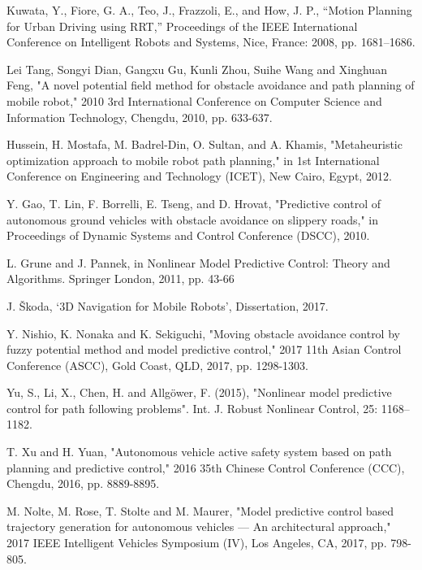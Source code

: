 \documentclass[conference,11pt]{IEEEtran}
\begin{document}
\balance

\begin{thebibliography}{00}
	
	Kuwata, Y., Fiore, G. A., Teo, J., Frazzoli, E., and How, J. P., “Motion Planning for Urban Driving using RRT,” Proceedings of the IEEE International Conference on Intelligent Robots and Systems, Nice, France: 2008, pp. 1681–1686.
	
	Lei Tang, Songyi Dian, Gangxu Gu, Kunli Zhou, Suihe Wang and Xinghuan Feng, "A novel potential field method for obstacle avoidance and path planning of mobile robot," 2010 3rd International Conference on Computer Science and Information Technology, Chengdu, 2010, pp. 633-637.
	
	Hussein, H. Mostafa, M. Badrel-Din, O. Sultan, and A. Khamis, "Metaheuristic optimization approach to mobile robot path planning," in 1st International Conference on Engineering and Technology (ICET), New Cairo, Egypt, 2012.
	
	Y. Gao, T. Lin, F. Borrelli, E. Tseng, and D. Hrovat, "Predictive control of autonomous ground vehicles with obstacle avoidance on slippery roads," in Proceedings of Dynamic Systems and Control Conference (DSCC), 2010.
	
	L. Grune and J. Pannek, in Nonlinear Model Predictive Control: Theory and Algorithms. Springer London, 2011, pp. 43-66
	
	J. Škoda, ‘3D Navigation for Mobile Robots’, Dissertation, 2017.
	
	Y. Nishio, K. Nonaka and K. Sekiguchi, "Moving obstacle avoidance control by fuzzy potential method and model predictive control," 2017 11th Asian Control Conference (ASCC), Gold Coast, QLD, 2017, pp. 1298-1303.
	
	Yu, S., Li, X., Chen, H. and Allgöwer, F. (2015), "Nonlinear model predictive control for path following problems". Int. J. Robust Nonlinear Control, 25: 1168–1182. 
	
	T. Xu and H. Yuan, "Autonomous vehicle active safety system based on path planning and predictive control," 2016 35th Chinese Control Conference (CCC), Chengdu, 2016, pp. 8889-8895.
	
	M. Nolte, M. Rose, T. Stolte and M. Maurer, "Model predictive control based trajectory generation for autonomous vehicles — An architectural approach," 2017 IEEE Intelligent Vehicles Symposium (IV), Los Angeles, CA, 2017, pp. 798-805.
	

\end{thebibliography}
\end{document}
